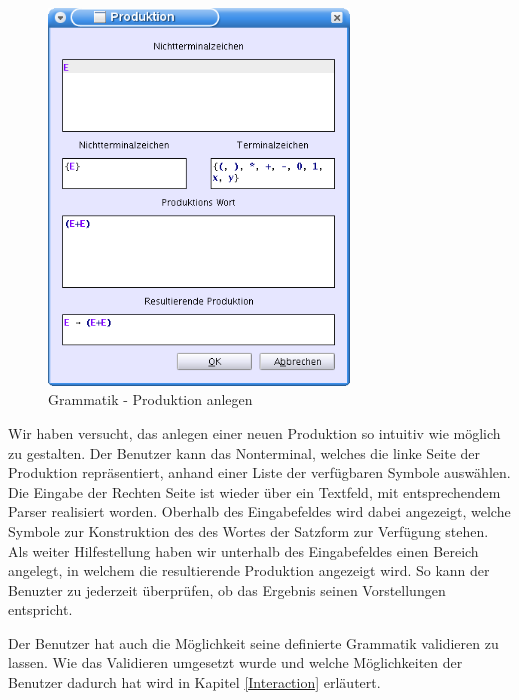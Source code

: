  \begin{figure}[h!]
  \begin{center}
  \includegraphics[width=8cm]{../images/production_dialog.png}
  \caption{Grammatik - Produktion anlegen}
  \end{center}
  \end{figure}


Wir haben versucht, das anlegen einer neuen Produktion so intuitiv wie möglich
zu gestalten. Der Benutzer kann das Nonterminal, welches die linke
Seite der Produktion repräsentiert, anhand einer Liste der
verfügbaren Symbole auswählen. Die Eingabe der Rechten Seite ist
wieder über ein Textfeld, mit entsprechendem Parser realisiert
worden. Oberhalb des Eingabefeldes wird dabei angezeigt, welche Symbole zur
Konstruktion des des Wortes der Satzform zur Verfügung stehen. Als weiter
Hilfestellung haben wir unterhalb des Eingabefeldes einen Bereich angelegt,
in welchem die resultierende Produktion angezeigt wird. So kann der
Benuzter zu jederzeit überprüfen, ob das Ergebnis seinen
Vorstellungen entspricht.\vspace{10pt}

Der Benutzer hat auch die Möglichkeit seine definierte Grammatik validieren zu
lassen. Wie das Validieren umgesetzt wurde und welche Möglichkeiten der
Benutzer dadurch hat wird in Kapitel \ref{Interaction} erläutert.
